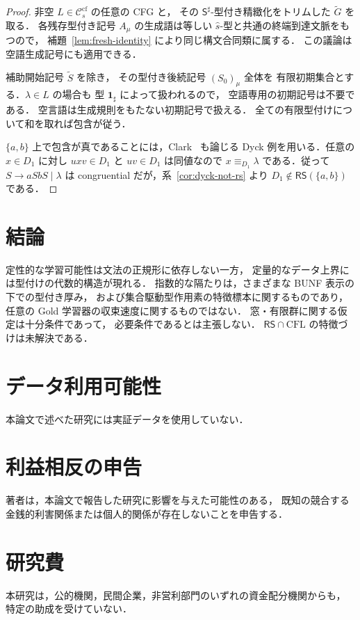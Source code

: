 \documentclass[11pt,a4paper]{ltjsarticle}
\theoremstyle{remark}
\theoremstyle{plain}
\newcommand{\cf}{\mathrm{cf}}
\newcommand{\Ccf}[1]{\mathcal C_{#1}^{\cf}}
\begin{document}
\begin{proof}
非空 $L\in\Ccf{s}$ の任意の CFG と，
その $\mathsf S^\sharp$-型付き精緻化をトリムした $\widetilde G$ を取る．
各残存型付き記号 $A_\mu$ の生成語は等しい
$\widehat s$-型と共通の終端到達文脈をもつので，
補題~\ref{lem:fresh-identity} により同じ構文合同類に属する．
この議論は空語生成記号にも適用できる．

補助開始記号 $\widetilde S$ を除き，
その型付き後続記号 $(S_0)_\mu$ 全体を
有限初期集合とする．$\lambda\in L$ の場合も
型 $\mathbf{1}_{\sharp}$ によって扱われるので，
空語専用の初期記号は不要である．
空言語は生成規則をもたない初期記号で扱える．
全ての有限型付けについて和を取れば包含が従う．

$\{a,b\}$ 上で包含が真であることには，Clark~\cite{clark2010congruential} も論じる
Dyck 例を用いる．任意の $x\in D_1$ に対し
$uxv\in D_1$ と $uv\in D_1$ は同値なので $x\equiv_{D_1}\lambda$ である．従って
$S\to aSbS\mid\lambda$ は congruential だが，系~\ref{cor:dyck-not-rs} より
$D_1\notin\mathsf{RS}(\{a,b\})$ である．
\end{proof}

\section{結論}

定性的な学習可能性は文法の正規形に依存しない一方，
定量的なデータ上界には型付けの代数的構造が現れる．
指数的な隔たりは，さまざまな BUNF 表示の下での型付き厚み，
および集合駆動型作用素の特徴標本に関するものであり，
任意の Gold 学習器の収束速度に関するものではない．
窓・有限群に関する仮定は十分条件であって，
必要条件であるとは主張しない．
$\mathsf{RS}\cap\mathrm{CFL}$ の特徴づけは未解決である．

\section*{データ利用可能性}
本論文で述べた研究には実証データを使用していない．

\section*{利益相反の申告}
著者は，本論文で報告した研究に影響を与えた可能性のある，
既知の競合する金銭的利害関係または個人的関係が存在しないことを申告する．

\section*{研究費}
本研究は，公的機関，民間企業，非営利部門のいずれの資金配分機関からも，
特定の助成を受けていない．
\end{document}
